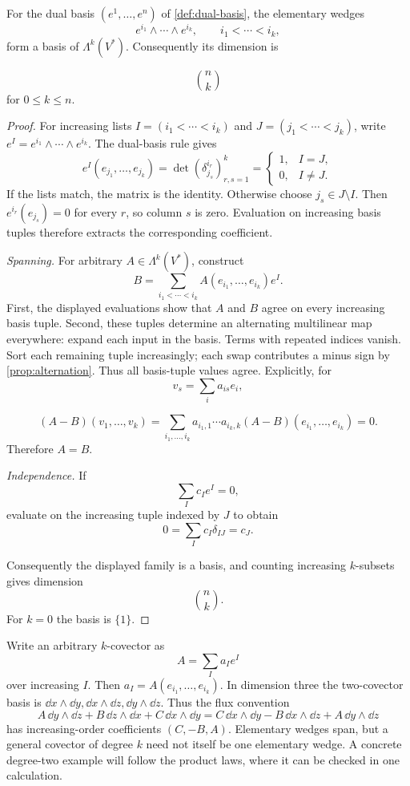 \begin{theorem}
\label{thm:exterior-covector-basis}
For the dual basis $(e^1,\ldots,e^n)$ of \cref{def:dual-basis}, the elementary wedges
\[
e^{i_1}\wedge\cdots\wedge e^{i_k},\qquad i_1<\cdots<i_k,
\]
form a basis of $\Lambda^k(V^*)$. Consequently its dimension is

\[
\binom nk
\]
 for $0\leq k\leq n$.
\end{theorem}
\begin{proof}
For increasing lists $I=(i_1<\cdots<i_k)$ and $J=(j_1<\cdots<j_k)$,
write $e^I=e^{i_1}\wedge\cdots\wedge e^{i_k}$. The dual-basis rule gives
\[
e^I(e_{j_1},\ldots,e_{j_k})=\det(\delta^{i_r}_{j_s})_{r,s=1}^k
=\begin{cases}1,&I=J,\\0,&I\ne J.\end{cases}
\]
If the lists match, the matrix is the identity. Otherwise choose
$j_s\in J\setminus I$. Then $e^{i_r}(e_{j_s})=0$ for every $r$, so
column $s$ is zero. Evaluation on increasing basis tuples therefore
extracts the corresponding coefficient.

\emph{Spanning.} For arbitrary $A\in\Lambda^k(V^*)$, construct
\[
B=\sum_{i_1<\cdots<i_k}A(e_{i_1},\ldots,e_{i_k})e^I.
\]
First, the displayed evaluations show that $A$ and $B$ agree on every
increasing basis tuple. Second, these tuples determine an alternating
multilinear map everywhere: expand each input in the basis. Terms with
repeated indices vanish. Sort each remaining tuple increasingly; each
swap contributes a minus sign by \cref{prop:alternation}. Thus all
basis-tuple values agree. Explicitly, for
\[
v_s=\sum_i a_{is}e_i,
\]

\[
(A-B)(v_1,\ldots,v_k)
=\sum_{i_1,\ldots,i_k}a_{i_1,1}\cdots a_{i_k,k}
(A-B)(e_{i_1},\ldots,e_{i_k})=0.
\]
Therefore $A=B$.

\emph{Independence.} If
\[
\sum_I c_Ie^I=0,
\]
 evaluate on the increasing
tuple indexed by $J$ to obtain
\[
0=\sum_Ic_I\delta_{IJ}=c_J.
\]

Consequently the displayed family is a basis, and counting increasing
$k$-subsets gives dimension
\[
\binom nk.
\]
 For $k=0$ the basis is $\{1\}$.
\end{proof}
Write an arbitrary $k$-covector as
\[
A=\sum_I a_Ie^I
\]
 over increasing $I$.
Then $a_I=A(e_{i_1},\ldots,e_{i_k})$. In dimension three the two-covector
basis is $\dd x\wedge\dd y,\dd x\wedge\dd z,\dd y\wedge\dd z$.
Thus the flux convention
\[
A\,\dd y\wedge\dd z+B\,\dd z\wedge\dd x+C\,\dd x\wedge\dd y
=C\,\dd x\wedge\dd y-B\,\dd x\wedge\dd z+A\,\dd y\wedge\dd z
\]
has increasing-order coefficients $(C,-B,A)$.
Elementary wedges span, but a general covector of degree $k$ need not
itself be one elementary wedge. A concrete degree-two example will follow
the product laws, where it can be checked in one calculation.

